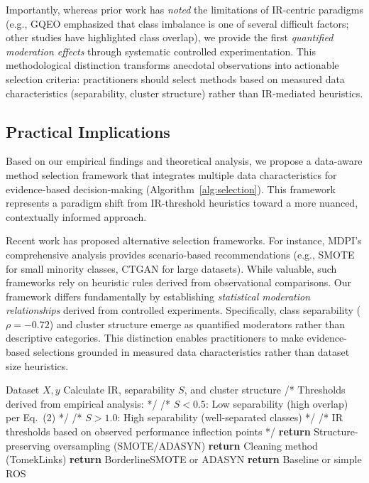 \documentclass[12pt,a4paper]{article}
\theoremstyle{definition}
\begin{document}
Importantly, whereas prior work has \textit{noted} the limitations of IR-centric paradigms (e.g., GQEO \cite{gqeo2024} emphasized that class imbalance is one of several difficult factors; other studies have highlighted class overlap), we provide the first \textit{quantified moderation effects} through systematic controlled experimentation. This methodological distinction transforms anecdotal observations into actionable selection criteria: practitioners should select methods based on measured data characteristics (separability, cluster structure) rather than IR-mediated heuristics.

\subsection{Practical Implications}
Based on our empirical findings and theoretical analysis, we propose a data-aware method selection framework that integrates multiple data characteristics for evidence-based decision-making (Algorithm~\ref{alg:selection}). This framework represents a paradigm shift from IR-threshold heuristics toward a more nuanced, contextually informed approach.

Recent work has proposed alternative selection frameworks. For instance, MDPI's comprehensive analysis \cite{mdpi2025} provides scenario-based recommendations (e.g., SMOTE for small minority classes, CTGAN for large datasets). While valuable, such frameworks rely on heuristic rules derived from observational comparisons. Our framework differs fundamentally by establishing \textit{statistical moderation relationships} derived from controlled experiments. Specifically, class separability ($\rho=-0.72$) and cluster structure emerge as quantified moderators rather than descriptive categories. This distinction enables practitioners to make evidence-based selections grounded in measured data characteristics rather than dataset size heuristics.

\begin{algorithm}[!ht]
\caption{Data-Aware Oversampling Selection}
\label{alg:selection}
\begin{algorithmic}[1]
\REQUIRE Dataset $X, y$
\STATE Calculate IR, separability $S$, and cluster structure
\STATE /* Thresholds derived from empirical analysis: */
\STATE /* $S < 0.5$: Low separability (high overlap) per Eq.~(2) */
\STATE /* $S > 1.0$: High separability (well-separated classes) */
\STATE /* IR thresholds based on observed performance inflection points */
 \STATE \textbf{return} Structure-preserving oversampling (SMOTE/ADASYN)
 \STATE \textbf{return} Cleaning method (TomekLinks)
 \STATE \textbf{return} BorderlineSMOTE or ADASYN
\ELSE
 \STATE \textbf{return} Baseline or simple ROS
\ENDIF
\end{algorithmic}
\end{algorithm}
\end{document}
